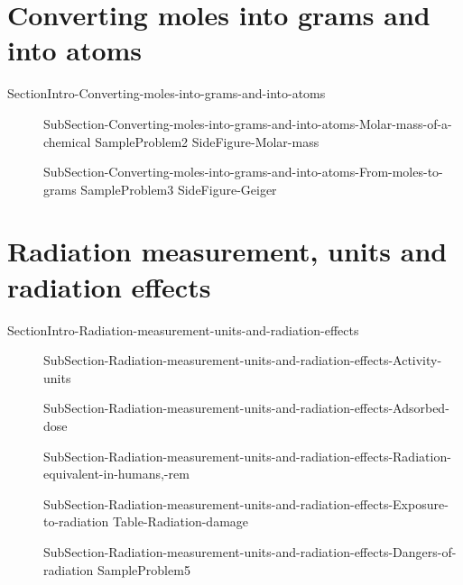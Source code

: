 \documentclass[main.tex]{subfiles}
\newcommand\chapterlabel{ChMIX-statesofmatter}\setcounter{figurenewcounter}{0}\setcounter{tablenewcounter}{0}\setcounter{formulanewcounter}{0}
\begin{document}
\section{\faEnvira Converting moles into grams and into atoms}
{SectionIntro-Converting-moles-into-grams-and-into-atoms}
\sloppy \begin{description}
\item[] {SubSection-Converting-moles-into-grams-and-into-atoms-Molar-mass-of-a-chemical}
{SampleProblem2}
   {SideFigure-Molar-mass}

{SubSection-Converting-moles-into-grams-and-into-atoms-From-moles-to-grams}
 {SampleProblem3}
  \renewcommand\chapterlabel{Ch-nuclear} {SideFigure-Geiger}

\end{description}

 \renewcommand\chapterlabel{Ch-nuclear}
 
\section{\faFlash Radiation measurement, units and radiation effects}

{SectionIntro-Radiation-measurement-units-and-radiation-effects}
\begin{description}
\item[] 
{SubSection-Radiation-measurement-units-and-radiation-effects-Activity-units}
\item[] 
{SubSection-Radiation-measurement-units-and-radiation-effects-Adsorbed-dose}

\item[] 
{SubSection-Radiation-measurement-units-and-radiation-effects-Radiation-equivalent-in-humans,-rem}
 \item[] {SubSection-Radiation-measurement-units-and-radiation-effects-Exposure-to-radiation}
{Table-Radiation-damage}
\item[] 
{SubSection-Radiation-measurement-units-and-radiation-effects-Dangers-of-radiation}
  {SampleProblem5}
\end{description}
\end{document}
